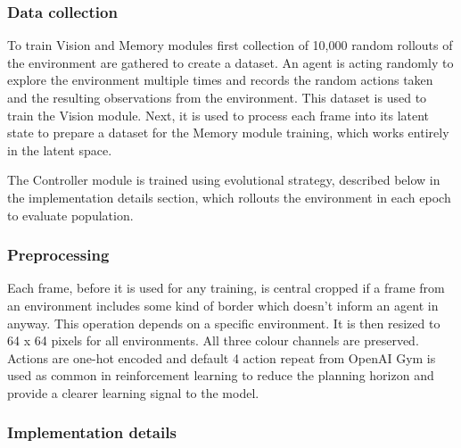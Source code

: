 \subsubsection{Data collection}

To train Vision and Memory modules first collection of 10,000 random rollouts of the environment are gathered to create a dataset. An agent is acting randomly to explore the environment multiple times and records the random actions taken and the resulting observations from the environment.
This dataset is used to train the Vision module. Next, it is used to process each frame into its latent state to prepare a dataset for the Memory module training, which works entirely in the latent space.

The Controller module is trained using evolutional strategy, described below in the implementation details section, which rollouts the environment in each epoch to evaluate population.

\subsubsection{Preprocessing}

Each frame, before it is used for any training, is central cropped if a frame from an environment includes some kind of border which doesn't inform an agent in anyway. This operation depends on a specific environment. It is then resized to 64 x 64 pixels for all environments. All three colour channels are preserved. Actions are one-hot encoded and default 4 action repeat from OpenAI Gym \cite{Code.OpenAIGym} is used as common in reinforcement learning \cite{Algo.DQN} to reduce the planning horizon and provide a clearer learning signal to the model.

\subsubsection{Implementation details}

